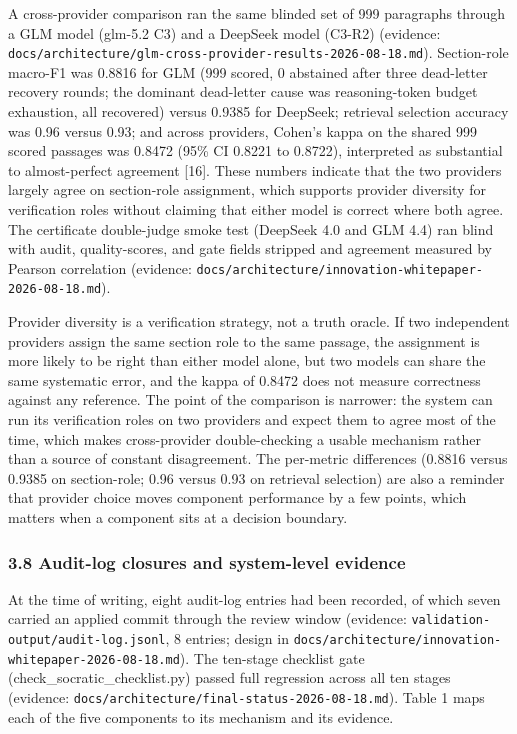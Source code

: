 \documentclass[
]{article}
\begin{document}
A cross-provider comparison ran the same blinded set of 999 paragraphs
through a GLM model (glm-5.2 C3) and a DeepSeek model (C3-R2) (evidence:
\texttt{docs/architecture/glm-cross-provider-results-2026-08-18.md}).
Section-role macro-F1 was 0.8816 for GLM (999 scored, 0 abstained after
three dead-letter recovery rounds; the dominant dead-letter cause was
reasoning-token budget exhaustion, all recovered) versus 0.9385 for
DeepSeek; retrieval selection accuracy was 0.96 versus 0.93; and across
providers, Cohen's kappa on the shared 999 scored passages was 0.8472
(95\% CI 0.8221 to 0.8722), interpreted as substantial to almost-perfect
agreement {[}16{]}. These numbers indicate that the two providers
largely agree on section-role assignment, which supports provider
diversity for verification roles without claiming that either model is
correct where both agree. The certificate double-judge smoke test
(DeepSeek 4.0 and GLM 4.4) ran blind with audit, quality-scores, and
gate fields stripped and agreement measured by Pearson correlation
(evidence:
\texttt{docs/architecture/innovation-whitepaper-2026-08-18.md}).

Provider diversity is a verification strategy, not a truth oracle. If
two independent providers assign the same section role to the same
passage, the assignment is more likely to be right than either model
alone, but two models can share the same systematic error, and the kappa
of 0.8472 does not measure correctness against any reference. The point
of the comparison is narrower: the system can run its verification roles
on two providers and expect them to agree most of the time, which makes
cross-provider double-checking a usable mechanism rather than a source
of constant disagreement. The per-metric differences (0.8816 versus
0.9385 on section-role; 0.96 versus 0.93 on retrieval selection) are
also a reminder that provider choice moves component performance by a
few points, which matters when a component sits at a decision boundary.

\subsubsection{3.8 Audit-log closures and system-level
evidence}\label{audit-log-closures-and-system-level-evidence}

At the time of writing, eight audit-log entries had been recorded, of
which seven carried an applied commit through the review window
(evidence: \texttt{validation-output/audit-log.jsonl}, 8 entries; design
in \texttt{docs/architecture/innovation-whitepaper-2026-08-18.md}). The
ten-stage checklist gate (check\_socratic\_checklist.py) passed full
regression across all ten stages (evidence:
\texttt{docs/architecture/final-status-2026-08-18.md}). Table 1 maps
each of the five components to its mechanism and its evidence.
\end{document}
